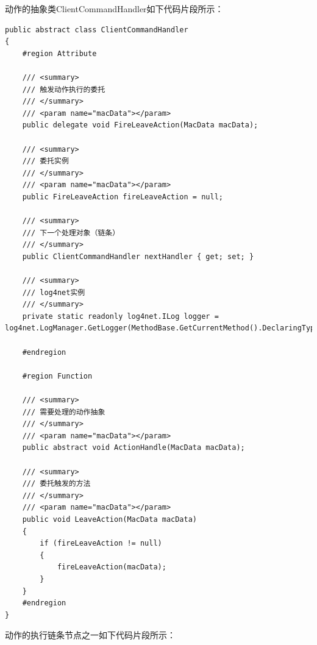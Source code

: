 \documentclass{book}
\begin{document}
动作的抽象类ClientCommandHandler如下代码片段所示：

\begin{lstlisting}
public abstract class ClientCommandHandler
{
	#region Attribute

	/// <summary>
	/// 触发动作执行的委托
	/// </summary>
	/// <param name="macData"></param>
	public delegate void FireLeaveAction(MacData macData);
	
	/// <summary>
	/// 委托实例
	/// </summary>
	/// <param name="macData"></param>
	public FireLeaveAction fireLeaveAction = null;
	
	/// <summary>
	/// 下一个处理对象（链条）
	/// </summary>
	public ClientCommandHandler nextHandler { get; set; }
	
	/// <summary>
	/// log4net实例
	/// </summary>
	private static readonly log4net.ILog logger = log4net.LogManager.GetLogger(MethodBase.GetCurrentMethod().DeclaringType);
	
	#endregion
	
	#region Function
	
	/// <summary>
	/// 需要处理的动作抽象
	/// </summary>
	/// <param name="macData"></param>
	public abstract void ActionHandle(MacData macData);
	
	/// <summary>
	/// 委托触发的方法
	/// </summary>
	/// <param name="macData"></param>
	public void LeaveAction(MacData macData)
	{
	    if (fireLeaveAction != null)
	    {
	        fireLeaveAction(macData);
	    }
	}
	#endregion
}
\end{lstlisting}

动作的执行链条节点之一如下代码片段所示：
\end{document}
